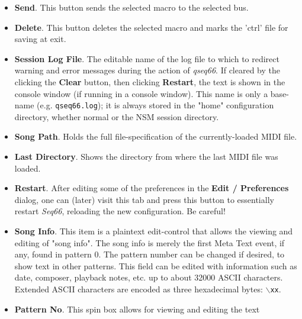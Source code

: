 \begin{itemize}
         The drop-down contains this item as the first, and default one.
         It specifies the MIDI control out port.
         After this item, all of the available output ports are 
         shown. This makes it easy to direct a macro to another
         device.
      \item \textbf{Send}.
         This button sends the selected macro to the selected bus.
      \item \textbf{Delete}.
         This button deletes the selected macro and marks the 'ctrl'
         file for saving at exit.
      \item \textbf{Session Log File}.
         The editable name of the log file
         to which to redirect warning
         and error messages during the action of \textsl{qseq66}.
         If cleared by the clicking the \textbf{Clear} button,
         then clicking \textbf{Restart},
         the text is shown in the console window (if running in a
         console window). This name is only a base-name (e.g.
         \texttt{qseq66.log}); it is always stored in the "home" configuration
         directory, whether normal or the NSM session directory.
      \item \textbf{Song Path}.
         Holds the full file-specification of the currently-loaded MIDI
         file.
      \item \textbf{Last Directory}.
         Shows the directory from where the last MIDI file was loaded.
      \item \textbf{Restart}.
         After editing some of the preferences in the \textbf{Edit / Preferences}
         dialog, one can (later)
         visit this tab and press this button to essentially
         restart \textsl{Seq66}, reloading the new configuration.
         Be careful!
      \item \textbf{Song Info}.
         This item is a plaintext edit-control that allows the viewing and
         editing of "song info".
         The song info is merely the first Meta Text event, if any,
         found in pattern 0.
         The pattern number can be changed if desired, to show text in other
         patterns.
         This field can be edited with information such as date, composer,
         playback notes, etc. up to about 32000 ASCII characters.
         Extended ASCII characters are encoded as three hexadecimal
         bytes: \texttt{$\backslash$xx}.
      \item \textbf{Pattern No}.
         This spin box allows for viewing and editing the text

\end{itemize}
